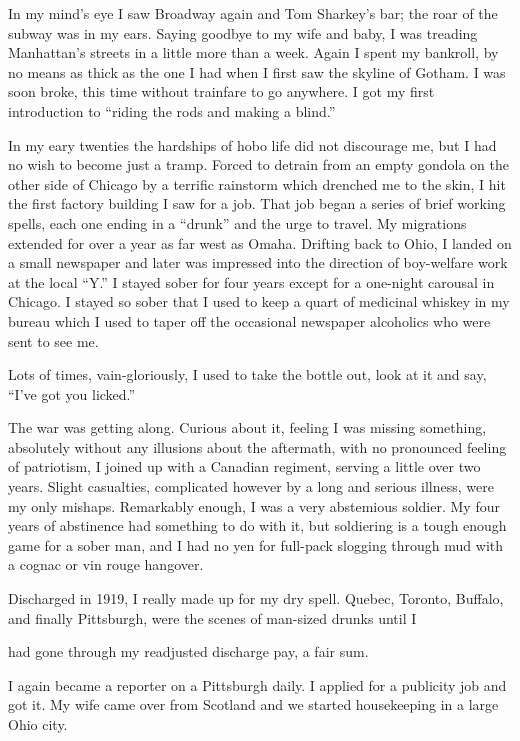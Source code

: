 In my mind’s eye I saw Broadway again and Tom Sharkey’s bar; the roar of the subway was in my ears. Saying goodbye to my wife and baby, I was treading Manhattan’s streets in a little more than a week. Again I spent my bankroll, by no means as thick as the one I had when I first saw the skyline of Gotham. I was soon broke, this time without trainfare to go anywhere. I got my first introduction to “riding the rods and making a blind.”

      In my eary twenties the hardships of hobo life did not discourage me, but I had no wish to become just a tramp. Forced to detrain from an empty gondola on the other side of Chicago by a terrific rainstorm which drenched me to the skin, I hit the first factory building I saw for a job. That job began a series of brief working spells, each one ending in a “drunk” and the urge to travel. My migrations extended for over a year as far west as Omaha. Drifting back to Ohio, I landed on a small newspaper and later was impressed into the direction of boy-welfare work at the local “Y.” I stayed sober for four years except for a one-night carousal in Chicago. I stayed so sober that I used to keep a quart of medicinal whiskey in my bureau which I used to taper off the occasional newspaper alcoholics who were sent to see me.

Lots of times, vain-gloriously, I used to take the bottle out, look at it and say, “I’ve got you licked.”

The war was getting along. Curious about it, feeling I was missing something, absolutely without any illusions about the aftermath, with no pronounced feeling of patriotism, I joined up with a Canadian regiment, serving a little over two years. Slight casualties, complicated however by a long and serious illness, were my only mishaps. Remarkably enough, I was a very abstemious soldier. My four years of abstinence had something to do with it, but soldiering is a tough enough game for a sober man, and I had no yen for full-pack slogging through mud with a cognac or vin rouge hangover.

Discharged in 1919, I really made up for my dry spell. Quebec, Toronto, Buffalo, and finally Pittsburgh, were the scenes of man-sized drunks until I

had gone through my readjusted discharge pay, a fair sum.

I again became a reporter on a Pittsburgh daily. I applied for a publicity job and got it. My wife came over from Scotland and we started housekeeping in a large Ohio city.

